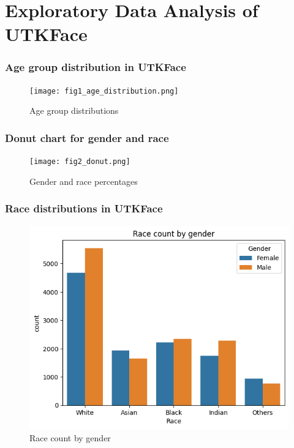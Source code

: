 \documentclass[aspectratio=169]{beamer}
\begin{document}
\section{Exploratory Data Analysis of UTKFace}
\begin{frame}
\frametitle{Age group distribution in UTKFace}
\begin{figure}
    \centering
    \texttt{[image: fig1\_age\_distribution.png]}
    \caption{Age group distributions}
    \label{fig1}
\end{figure}
\end{frame}

\begin{frame}
\frametitle{Donut chart for gender and race}
\begin{figure}
    \centering
    \texttt{[image: fig2\_donut.png]}
    \caption{Gender and race percentages}
    \label{fig2}
\end{figure}
\end{frame}

\begin{frame}
\frametitle{Race distributions in UTKFace}
\begin{figure}
    \centering
    \includegraphics[scale=0.50]{fig3_race_count.png}
    \caption{Race count by gender}
    \label{fig3}
\end{figure}
\end{frame}
\end{document}
